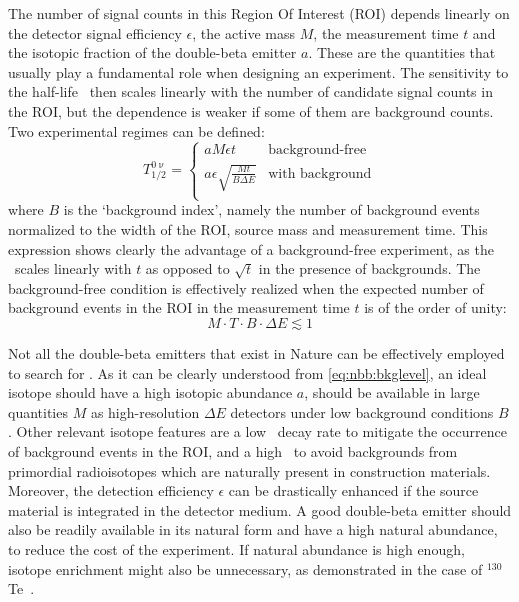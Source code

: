 The number of signal counts in this Region Of Interest (ROI) depends linearly
on the detector signal efficiency $\epsilon$, the active mass $M$, the
measurement time $t$ and the isotopic fraction of the double-beta emitter $a$.
These are the quantities that usually play a fundamental role when designing an
experiment. The sensitivity to the half-life \thalfzero\ then scales linearly
with the number of candidate signal counts in the ROI, but the dependence is
weaker if some of them are background counts. Two experimental regimes can be
defined:
\begin{equation}\label{eq:nbb:bkglevel}
  T^{0\upnu}_{1/2} =
    \begin{cases}
      a M \epsilon t & \text{background-free} \\
      a \epsilon \sqrt{\frac{M t}{B \Delta{E}}} & \text{with background} \\
    \end{cases}
\end{equation}
where $B$ is the `background index', namely the number of background events
normalized to the width of the ROI, source mass and measurement time. This
expression shows clearly the advantage of a background-free experiment, as the
\thalfzero\ scales linearly with $t$ as opposed to $\sqrt{t}$ in the presence
of backgrounds. The background-free condition is effectively realized when the
expected number of background events in the ROI in the measurement time $t$ is
of the order of unity:
\[
  M \cdot T \cdot B \cdot \Delta{E} \lesssim 1
\]

Not all the double-beta emitters that exist in Nature can be effectively
employed to search for \onbb. As it can be clearly understood from
\cref{eq:nbb:bkglevel}, an ideal isotope should have a high isotopic abundance
$a$, should be available in large quantities $M$ as high-resolution $\Delta{E}$
detectors under low background conditions $B$. Other relevant isotope features
are a low \nnbb\ decay rate to mitigate the occurrence of background events in
the ROI, and a high \qbb\ to avoid backgrounds from primordial radioisotopes
which are naturally present in construction materials. Moreover, the detection
efficiency $\epsilon$ can be drastically enhanced if the source material is
integrated in the detector medium.  A good double-beta emitter should also be
readily available in its natural form and have a high natural abundance, to
reduce the cost of the experiment. If natural abundance is high enough, isotope
enrichment might also be unnecessary, as demonstrated in the case of
$^{130}$Te~\cite{Alduino2017}.


